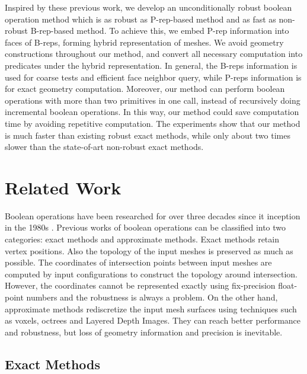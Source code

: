 \documentclass[10pt,journal,compsoc]{IEEEtran}
\begin{document}
Inspired by these previous work, we develop an unconditionally robust boolean operation method which is as robust as P-rep-based method and as fast as non-robust B-rep-based method. To achieve this, we embed P-rep information into faces of B-reps, forming hybrid representation of meshes. We avoid geometry constructions throughout our method, and convert all necessary computation into predicates under the hybrid representation. In general, the B-reps information is used for coarse tests and efficient face neighbor query, while P-reps information is for exact geometry computation. Moreover, our method can perform boolean operations with more than two primitives in one call, instead of recursively doing incremental boolean operations. In this way, our method could save computation time by avoiding repetitive computation. The experiments show that our method is much faster than existing robust exact methods, while only about two times slower than the state-of-art non-robust exact methods.



\section{Related Work}

Boolean operations have been researched for over three decades since it inception in the 1980s \cite{requicha1985boolean, laidlaw1986constructive}. Previous works of boolean operations can be classified into two categories: exact methods and approximate methods. Exact methods retain vertex positions. Also the topology of the input meshes is preserved as much as possible. The coordinates of intersection points between input meshes are computed by input configurations to construct the topology around intersection. However, the coordinates cannot be represented exactly using fix-precision float-point numbers and the robustness is always a problem. On the other hand, approximate methods rediscretize the input mesh surfaces using techniques such as voxels, octrees and Layered Depth Images. They can reach better performance and robustness, but loss of geometry information and precision is inevitable.

\subsection{Exact Methods}

\end{document}
